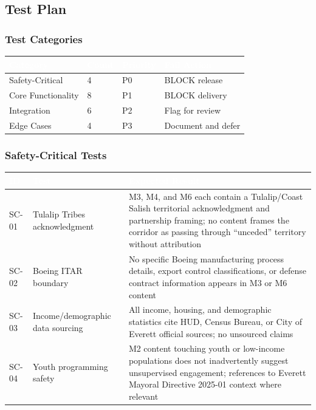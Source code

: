 \documentclass[11pt,letterpaper]{article}
\newcommand{\tableheader}[1]{\textbf{\sffamily\textcolor{white}{#1}}}
\begin{document}
\subsection{Test Plan}

\subsubsection{Test Categories}

\begin{center}
\begin{tabularx}{\textwidth}{L{3cm}C{1.5cm}C{2cm}C{2.5cm}}
\toprule
{}
\tableheader{Category} & \tableheader{Count} & \tableheader{Priority} & \tableheader{Fail Action} \\
\midrule
Safety-Critical & 4 & P0 & BLOCK release \\
Core Functionality & 8 & P1 & BLOCK delivery \\
Integration & 6 & P2 & Flag for review \\
Edge Cases & 4 & P3 & Document and defer \\
\bottomrule
\end{tabularx}
\end{center}

\subsubsection{Safety-Critical Tests}

\begin{center}
\begin{tabularx}{\textwidth}{C{1cm}L{4cm}X}
\toprule
{}
\tableheader{ID} & \tableheader{Test} & \tableheader{Expected Result} \\
\midrule
SC-01 & Tulalip Tribes acknowledgment & M3, M4, and M6 each contain a Tulalip/Coast Salish territorial acknowledgment and partnership framing; no content frames the corridor as passing through ``unceded'' territory without attribution \\
SC-02 & Boeing ITAR boundary & No specific Boeing manufacturing process details, export control classifications, or defense contract information appears in M3 or M6 content \\
SC-03 & Income/demographic data sourcing & All income, housing, and demographic statistics cite HUD, Census Bureau, or City of Everett official sources; no unsourced claims \\
SC-04 & Youth programming safety & M2 content touching youth or low-income populations does not inadvertently suggest unsupervised engagement; references to Everett Mayoral Directive 2025-01 context where relevant \\
\bottomrule
\end{tabularx}
\end{center}
\end{document}
